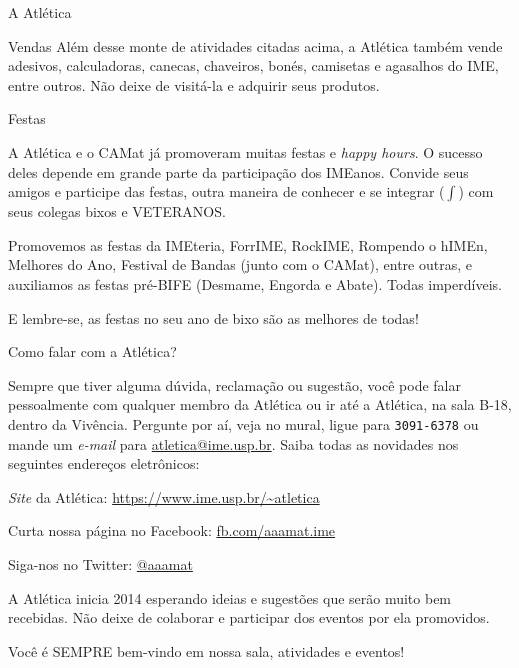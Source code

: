 \begin{secao}{A Atlética}
\begin{subsecao}{Vendas}
Além desse monte de atividades citadas acima, a Atlética também vende
adesivos, calculadoras, canecas, chaveiros, bonés, camisetas e agasalhos do IME,
entre outros. Não deixe de visitá-la e adquirir seus produtos.

\end{subsecao}

\begin{subsecao}{Festas}

A Atlética e o CAMat já promoveram muitas festas e \textit{happy hours}. O sucesso
deles depende em grande parte da participação dos IMEanos. Convide seus
amigos e participe das festas, outra maneira de conhecer e se
integrar ($\int$) com seus colegas bixos e VETERANOS.

Promovemos as festas da IMEteria, ForrIME, RockIME, Rompendo o hIMEn,
Melhores do Ano, Festival de Bandas (junto com o CAMat), entre outras, e
auxiliamos as festas pré-BIFE (Desmame, Engorda e Abate). Todas imperdíveis.

E lembre-se, as festas no seu ano de bixo são as melhores de todas!

\end{subsecao}

\begin{subsecao}{Como falar com a Atlética?}

Sempre que tiver alguma dúvida, reclamação ou sugestão, você pode falar
pessoalmente com qualquer membro da Atlética ou ir até a Atlética, na sala
B-18, dentro da Vivência. Pergunte por aí, veja no mural, ligue para {\tt 3091-6378} ou mande um \textit{e-mail} para \url{atletica@ime.usp.br}.
Saiba todas as novidades nos seguintes endereços eletrônicos:

\textit{Site} da Atlética: \url{https://www.ime.usp.br/~atletica}

Curta nossa página no Facebook: \url{fb.com/aaamat.ime}

Siga-nos no Twitter: \url{@aaamat}

A Atlética inicia 2014 esperando ideias e sugestões que serão muito bem
recebidas. Não deixe de colaborar e participar dos eventos por ela promovidos.

Você é SEMPRE bem-vindo em nossa sala, atividades e eventos!

\end{subsecao}
\end{secao}
